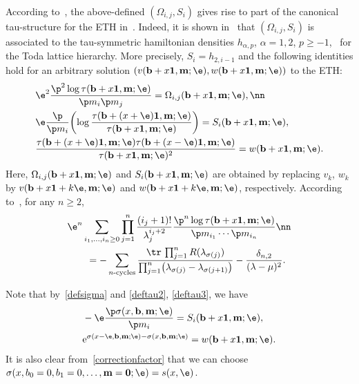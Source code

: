 According to~\cite{DY}, the above-defined $(\Omega_{i,j}, S_i)$ gives rise to part of
the canonical tau-structure for the ETH in~\cite{CDZ, DZ-toda}.
Indeed, it is shown in~\cite{DY} that $(\Omega_{i,j}, S_i)$ is associated to the
tau-symmetric hamiltonian densities $h_{\alpha,p}$, $\alpha=1,2$, $p\ge-1$,~\cite{CDZ, DZ-toda} for the Toda lattice hierarchy.
More precisely, $S_i=h_{2,i-1}$ and the following identities hold
for an arbitrary solution $(v({\bf b}+x{\bf 1},{\bf m};\e), w({\bf b}+x{\bf 1},{\bf m};\e))$ to the ETH:
\begin{align}
& \e^2\frac{\p^2 \log\tau({\bf b}+x{\bf 1},{\bf m};\e)}{\p m_i \p m_j}=\Omega_{i,j}({\bf b}+x{\bf 1},{\bf m};\e),\nn \\%
& \e \frac{\p}{\p m_i} \biggl(\log \frac{\tau({\bf b}+(x+\e){\bf 1},{\bf m};\e)}{\tau({\bf b}+x{\bf 1},{\bf m};\e)}\biggr) =
S_i({\bf b}+x{\bf 1},{\bf m};\e), \label{deftau2} \\
& \frac{\tau({\bf b}+(x+\e){\bf 1},{\bf m};\e)\tau({\bf b}+(x-\e){\bf 1},{\bf m};\e)}{\tau({\bf b}+x{\bf 1},{\bf m};\e)^2} = w({\bf b}+x{\bf 1},{\bf m};\e). \label{deftau3}
\end{align}
Here, $\Omega_{i,j}({\bf b}+x{\bf 1},{\bf m};\e)$ and
$S_i({\bf b}+x{\bf 1},{\bf m};\e)$ are obtained by replacing $v_k$, $w_k$ by $v({\bf b}+x{\bf 1}+k\e,{\bf m};\e)$ and
$w({\bf b}+x{\bf 1}+k\e,{\bf m};\e)$, respectively.
According to~\cite{DY}, for any $n\ge2$,
\begin{align}
&\e^n \sum_{i_1,\dots,i_n\ge0}
\prod_{j=1}^n \frac{(i_j+1)!}{\lambda_j^{i_j+2}} \frac{\p^n \log \tau({\bf b}+x{\bf 1},{\bf m}; \e)}{\p m_{i_1} \cdots \p m_{i_n}}\nn\\
&\qquad{}= - \sum_{\text{$n$-cycles}}
\frac{\tr \, \prod_{j=1}^n R(\lambda_{\sigma(j)})}{\prod_{j=1}^n \bigl(\lambda_{\sigma(j)}-\lambda_{\sigma(j+1)}\bigr)} - \frac{\delta_{n,2}}{(\lambda-\mu)^2}.\label{multiderivativesresolvent}
\end{align}

Note that by~\eqref{defsigma} and \eqref{deftau2}, \eqref{deftau3}, we have
\begin{align}
& - \e\frac{\p \sigma(x, {\bf b},{\bf m};\e)}{\p m_i} = S_i({\bf b}+x{\bf 1},{\bf m};\e), \label{property1sigma} \\
& {\rm e}^{\sigma(x-\e, {\bf b},{\bf m};\e)-\sigma(x, {\bf b},{\bf m};\e)} = w({\bf b}+x{\bf 1},{\bf m};\e). \label{propertysigma}
\end{align}
It is also clear from~\eqref{correctionfactor} that we can choose
$\sigma(x, b_0=0, b_1=0, \dots, {\bf m}={\bf 0};\e)=s(x,\e)$.


